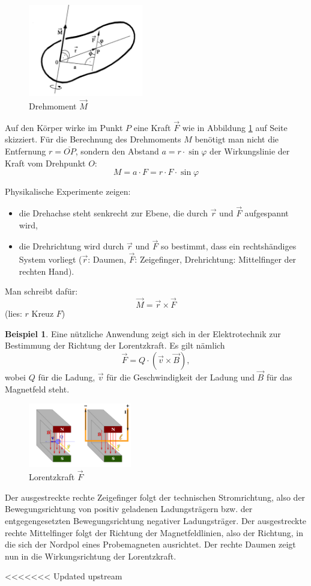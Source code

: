 \documentclass[%
11pt,%
twoside,%
titlepage,%
<<<<<<< Updated upstream
<<<<<<< Updated upstream
german,%
=======
swissgerman,%
>>>>>>> Stashed changes
=======
swissgerman,%
>>>>>>> Stashed changes
headsepline%
]{scrartcl}
\theoremstyle{definition}
\newtheorem{bsp}{Beispiel}[subsection] %
\theoremstyle{plain}
\begin{document}
\begin{figure}[ht]
\begin{center}
\includegraphics[width=5cm]{pictures/vprodukt}
\end{center}
\caption{Drehmoment $\vec{M}$}\label{abb:vektorprod}
\end{figure}

Auf den Körper wirke im Punkt $P$ eine Kraft $\vec{F}$ wie in Abbildung \ref{abb:vektorprod} auf Seite \pageref{abb:vektorprod} skizziert. Für die Berechnung des Drehmoments $M$ benötigt man nicht die Entfernung $r =\overline{OP}$, sondern den Abstand $a =r\cdot\sin\varphi$ der Wirkungslinie der Kraft vom Drehpunkt $O$:
$$M =a\cdot F =r\cdot F\cdot \sin\varphi$$

Physikalische Experimente zeigen:
\begin{itemize}
\item die Drehachse steht senkrecht zur Ebene, die durch
$\vec{r}$ und $\vec{F}$ aufgespannt wird,
\item die Drehrichtung wird durch $\vec{r}$ und $\vec{F}$ so bestimmt,
dass ein rechtshändiges System vorliegt ($\vec{r}$: Daumen,
$\vec{F}$: Zeigefinger, Drehrichtung: Mittelfinger der rechten Hand).
\end{itemize}
Man schreibt dafür:
$$\vec{M}=\vec{r}\times\vec{F}$$
(lies: \glqq $r$ Kreuz $F$\grqq)

\begin{bsp}
Eine nützliche Anwendung zeigt sich in der Elektrotechnik zur Bestimmung der Richtung der Lorentzkraft. Es gilt nämlich
$$\vec{F}=Q\cdot(\vec{v}\times\vec{B}),$$
wobei $Q$ für die Ladung, $\vec{v}$ für die Geschwindigkeit der Ladung und $\vec{B}$ für das Magnetfeld steht.
\begin{figure}
\begin{center}
\includegraphics[width=0.4\textwidth]{pictures/lorentz.png}
\caption{Lorentzkraft $\vec{F}$}
\end{center}
\end{figure}
Der ausgestreckte rechte Zeigefinger folgt der technischen Stromrichtung, also der Bewegungsrichtung von positiv geladenen Ladungsträgern bzw. der entgegengesetzten Bewegungsrichtung negativer Ladungsträger.
Der ausgestreckte rechte Mittelfinger folgt der Richtung der Magnetfeldlinien, also der Richtung, in die sich der Nordpol eines Probemagneten ausrichtet.
Der rechte Daumen zeigt nun in die Wirkungsrichtung der Lorentzkraft.
\end{bsp}

\cleardoublepage

\listoffigures

<<<<<<< Updated upstream
\end{document}
